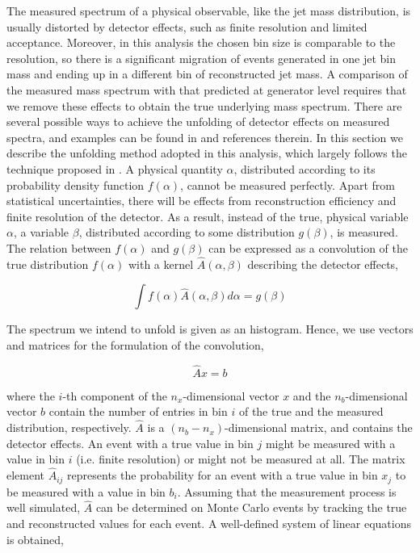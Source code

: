 The measured spectrum of a physical observable, like the jet mass distribution, is usually distorted by	detector effects, such as finite resolution and limited acceptance. Moreover, in this analysis the chosen bin size is comparable to the resolution, so there is a significant migration of events generated in one jet bin mass and ending up in a different bin of reconstructed jet mass. A comparison of the measured mass spectrum with that predicted at generator level requires that we remove these effects to obtain the true underlying mass spectrum. There are several possible ways to achieve the unfolding of detector effects on measured spectra, and examples can be found in \cite{unfold} and references therein. In this section we describe the unfolding method adopted in this analysis, which largely follows the technique proposed in \cite{agostini}. 
A physical quantity $\alpha$, distributed according to its probability density function $f(\alpha)$, cannot be measured perfectly. Apart from statistical uncertainties, there will be effects from reconstruction efficiency and finite resolution of the detector. As	a result, instead of the true, physical variable $\alpha$, a variable $\beta$, distributed according to some distribution $g(\beta)$, is measured. The relation between $f(\alpha)$ and $g(\beta)$ can be expressed as a convolution of the true distribution $f(\alpha)$ with a kernel $\hat{A}(\alpha,\beta)$ describing the detector effects,

\begin{equation}
\int f(\alpha) \hat{A}(\alpha,\beta)d\alpha = g(\beta)
\end{equation}

\noindent The spectrum we intend to unfold is given as an histogram. Hence, we use vectors and matrices for the formulation of the convolution,	

\begin{equation}
\hat{A} x = b
\label{eq:unf1}
\end{equation}

\noindent where the $i$-th component of the $n_x$-dimensional vector $x$ and the $n_b$-dimensional vector $b$ contain the number of entries in bin $i$ of the true and the measured distribution, respectively. 
$\hat{A}$ is a $(n_b - n_x)$-dimensional matrix, and contains the detector effects. An event with a true value in bin $j$ might be measured with a value in bin $i$ (i.e. finite resolution) or might not be measured at all. The matrix element $\hat{A}_{ij}$ represents the probability for an event	 with a true value in bin $x_j$ to be measured with a value in bin $b_i$.
Assuming that the measurement process is well simulated, $\hat{A}$ can be determined on Monte Carlo events by tracking the true and reconstructed values for each event. A well-defined system of linear equations is obtained,


